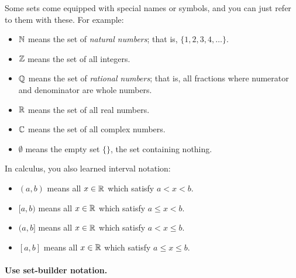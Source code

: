 \documentclass{tufte-book}
\begin{document}
Some sets come equipped with special names or symbols, and you can just refer to them with these. For example:
\begin{itemize}
    \item $\mathbb{N}$ means the set of \emph{natural numbers}; that is, $\{1, 2, 3, 4, \dots\}$.
    \item $\mathbb{Z}$ means the set of all integers.
    \item $\mathbb{Q}$ means the set of \emph{rational numbers}; that is, all fractions where numerator and denominator are whole numbers.
    \item $\mathbb{R}$ means the set of all real numbers.
    \item $\mathbb{C}$ means the set of all complex numbers.
    \item $\emptyset$ means the empty set $\{\}$, the set containing nothing.
\end{itemize}
In calculus, you also learned interval notation:
\begin{itemize}
    \item $(a,b)$ means all $x \in \mathbb{R}$ which satisfy $a < x < b$.
    \item $[a,b)$ means all $x \in \mathbb{R}$ which satisfy $a \leq x < b$.
    \item $(a,b]$ means all $x \in \mathbb{R}$ which satisfy $a < x \leq b$.
    \item $[a,b]$ means all $x \in \mathbb{R}$ which satisfy $a \leq x \leq b$.
\end{itemize}


\paragraph{Use set-builder notation.}
\label{sec:use-set-builder}
\end{document}
